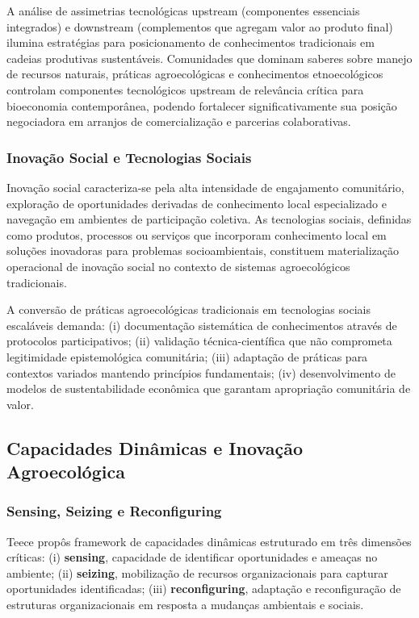 A análise de assimetrias tecnológicas upstream (componentes essenciais integrados) e downstream (complementos que agregam valor ao produto final) \cite{AdnerKapoor2010} ilumina estratégias para posicionamento de conhecimentos tradicionais em cadeias produtivas sustentáveis. Comunidades que dominam saberes sobre manejo de recursos naturais, práticas agroecológicas e conhecimentos etnoecológicos controlam componentes tecnológicos upstream de relevância crítica para bioeconomia contemporânea, podendo fortalecer significativamente sua posição negociadora em arranjos de comercialização e parcerias colaborativas.

\subsubsection{Inovação Social e Tecnologias Sociais}

Inovação social caracteriza-se pela alta intensidade de engajamento comunitário, exploração de oportunidades derivadas de conhecimento local especializado e navegação em ambientes de participação coletiva. As tecnologias sociais, definidas como produtos, processos ou serviços que incorporam conhecimento local em soluções inovadoras para problemas socioambientais, constituem materialização operacional de inovação social no contexto de sistemas agroecológicos tradicionais.

A conversão de práticas agroecológicas tradicionais em tecnologias sociais escaláveis demanda: (i) documentação sistemática de conhecimentos através de protocolos participativos; (ii) validação técnica-científica que não comprometa legitimidade epistemológica comunitária; (iii) adaptação de práticas para contextos variados mantendo princípios fundamentais; (iv) desenvolvimento de modelos de sustentabilidade econômica que garantam apropriação comunitária de valor.

\subsection{Capacidades Dinâmicas e Inovação Agroecológica}

\subsubsection{Sensing, Seizing e Reconfiguring}

Teece \cite{Teece2007} propôs framework de capacidades dinâmicas estruturado em três dimensões críticas: (i) \textbf{sensing}, capacidade de identificar oportunidades e ameaças no ambiente; (ii) \textbf{seizing}, mobilização de recursos organizacionais para capturar oportunidades identificadas; (iii) \textbf{reconfiguring}, adaptação e reconfiguração de estruturas organizacionais em resposta a mudanças ambientais e sociais.


